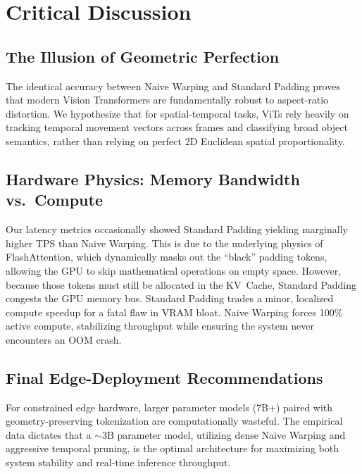 \documentclass[conference]{IEEEtran}
\begin{document}
\section{Critical Discussion}

\subsection{The Illusion of Geometric Perfection}
The identical accuracy between Naive Warping and Standard Padding proves that
modern Vision Transformers are fundamentally robust to aspect-ratio
distortion.
We hypothesize that for spatial-temporal tasks, ViTs rely heavily on tracking
temporal movement vectors across frames and classifying broad object
semantics, rather than relying on perfect 2D Euclidean spatial
proportionality.

\subsection{Hardware Physics: Memory Bandwidth vs.\ Compute}
Our latency metrics occasionally showed Standard Padding yielding marginally
higher TPS than Naive Warping.
This is due to the underlying physics of FlashAttention, which dynamically
masks out the ``black'' padding tokens, allowing the GPU to skip mathematical
operations on empty space.
However, because those tokens must still be allocated in the KV~Cache,
Standard Padding congests the GPU memory bus.
Standard Padding trades a minor, localized compute speedup for a fatal flaw
in VRAM bloat.
Naive Warping forces 100\% active compute, stabilizing throughput while
ensuring the system never encounters an OOM crash.

\subsection{Final Edge-Deployment Recommendations}
For constrained edge hardware, larger parameter models (7B$+$) paired with
geometry-preserving tokenization are computationally wasteful.
The empirical data dictates that a ${\sim}3$B parameter model, utilizing
dense Naive Warping and aggressive temporal pruning, is the optimal
architecture for maximizing both system stability and real-time inference
throughput.

\end{document}
